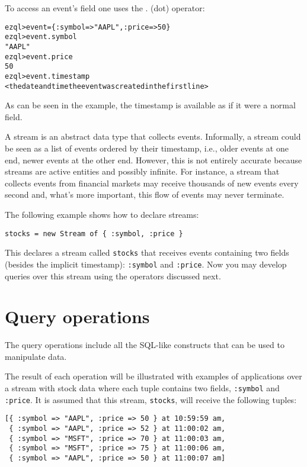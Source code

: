 \documentclass{report}
\newenvironment{evaluation}
{
  \framed
  \begin{alltt}
}
{
  \end{alltt}
  \endframed
}
\begin{document}
To access an event's field one uses the . (dot) operator:

\begin{evaluation}
ezql> event = \{ :symbol => "AAPL", :price => 50 \}
ezql> event.symbol
"AAPL"
ezql> event.price
50
ezql> event.timestamp
<the date and time the event was created in the first line>
\end{evaluation}

As can be seen in the example, the timestamp is available as if it
were a normal field.

A stream is an abstract data type that collects events. Informally, a
stream could be seen as a list of events ordered by their timestamp,
i.e., older events at one end, newer events at the other end. However,
this is not entirely accurate because streams are active entities and
possibly infinite. For instance, a stream that collects events from
financial markets may receive thousands of new events every second
and, what's more important, this flow of events may never terminate.

The following example shows how to declare streams:

\begin{verbatim}
stocks = new Stream of { :symbol, :price }
\end{verbatim}

This declares a stream called \verb=stocks= that receives events
containing two fields (besides the implicit timestamp): \verb=:symbol=
and \verb=:price=. Now you may develop queries over this stream using
the operators discussed next.

\section{Query operations}
\label{sec:query-operations}
The query operations include all the SQL-like constructs that can be
used to manipulate data.

The result of each operation will be illustrated with examples of
applications over a stream with stock data where each tuple contains
two fields, \verb=:symbol= and \verb=:price=. It is assumed that this
stream, \verb=stocks=, will receive the following tuples:

\begin{verbatim}
[{ :symbol => "AAPL", :price => 50 } at 10:59:59 am,
 { :symbol => "AAPL", :price => 52 } at 11:00:02 am,
 { :symbol => "MSFT", :price => 70 } at 11:00:03 am,
 { :symbol => "MSFT", :price => 75 } at 11:00:06 am,
 { :symbol => "AAPL", :price => 50 } at 11:00:07 am]
\end{verbatim}
\end{document}
